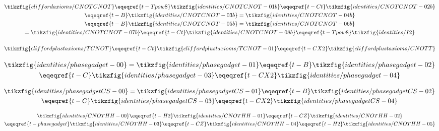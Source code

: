 \begin{derivation}\label{t-CX2}
\begin{gather*}
    \tikzfig{cliffordaxioms/CNOTCNOT}
    \eqeqref{t-Tpow8}\tikzfig{identities/CNOTCNOT-01b}
    \eqeqref{t-Ct}\tikzfig{identities/CNOTCNOT-02b}\\
    \eqeqref{t-B}\tikzfig{identities/CNOTCNOT-03b}
    =\tikzfig{identities/CNOTCNOT-04b}\\
    \eqeqref{t-B}\tikzfig{identities/CNOTCNOT-05b}
    =\tikzfig{identities/CNOTCNOT-06b}\\
    =\tikzfig{identities/CNOTCNOT-07b}
    \eqeqref{t-Ct}\tikzfig{identities/CNOTCNOT-08b}
    \eqeqref{t-Tpow8}\tikzfig{identities/I2}
\end{gather*}
\end{derivation}

\begin{derivation}\label{t-C}
\begin{gather*}
    \tikzfig{cliffordplustaxioms/TCNOT}
    \eqeqref{t-Ct}\tikzfig{cliffordplustaxioms/TCNOT-01}
    \eqeqref{t-CX2}\tikzfig{cliffordplustaxioms/CNOTT}
\end{gather*}
\end{derivation}

\begin{derivation}\label{t-phasegadget}
\begin{gather*}
    \tikzfig{identities/phasegadget-00}
    =\tikzfig{identities/phasegadget-01}
    \eqeqref{t-B}\tikzfig{identities/phasegadget-02}\\
    \eqeqref{t-C}\tikzfig{identities/phasegadget-03}
    \eqeqref{t-CX2}\tikzfig{identities/phasegadget-04}
\end{gather*}
\end{derivation}

\begin{derivation}\label{t-phasegadgetCS}
\begin{gather*}
    \tikzfig{identities/phasegadgetCS-00}
    =\tikzfig{identities/phasegadgetCS-01}
    \eqeqref{t-B}\tikzfig{identities/phasegadgetCS-02}\\
    \eqeqref{t-C}\tikzfig{identities/phasegadgetCS-03}
    \eqeqref{t-CX2}\tikzfig{identities/phasegadgetCS-04}
\end{gather*}
\end{derivation}

\begin{derivation}\label{t-CNOTHH}
\begin{gather*}
    \tikzfig{identities/CNOTHH-00}
    \eqeqref{t-H2}\tikzfig{identities/CNOTHH-01}
    \eqeqref{t-CZ}\tikzfig{identities/CNOTHH-02}\\
    \eqeqref{t-phasegadget}\tikzfig{identities/CNOTHH-03}
    \eqeqref{t-CZ}\tikzfig{identities/CNOTHH-04}
    \eqeqref{t-H2}\tikzfig{identities/CNOTHH-05}
\end{gather*}
\end{derivation}

